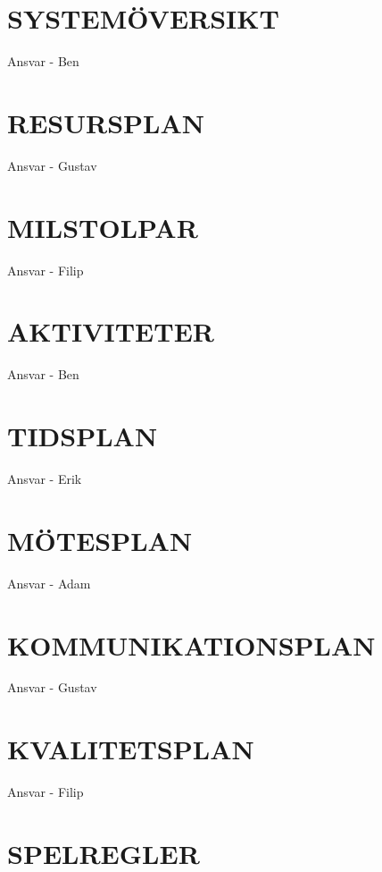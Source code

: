 \documentclass[a4paper]{article}
\begin{document}
\section{SYSTEMÖVERSIKT}
\label{sec:systemö}

Ansvar - Ben

\section{RESURSPLAN}
\label{sec:resurs}

Ansvar - Gustav

\section{MILSTOLPAR}
\label{sec:milstolpar}

Ansvar - Filip

\section{AKTIVITETER}
\label{sec:sktiviteter}

Ansvar - Ben

\section{TIDSPLAN}
\label{sec:tidsplan}

Ansvar - Erik

\section{MÖTESPLAN}
\label{sec:mötesplan}

Ansvar - Adam

\section{KOMMUNIKATIONSPLAN}
\label{sec:komm}

Ansvar - Gustav

\section{KVALITETSPLAN}
\label{sec:kval}

Ansvar - Filip

\section{SPELREGLER}
\label{sec:spelregler}
\end{document}
